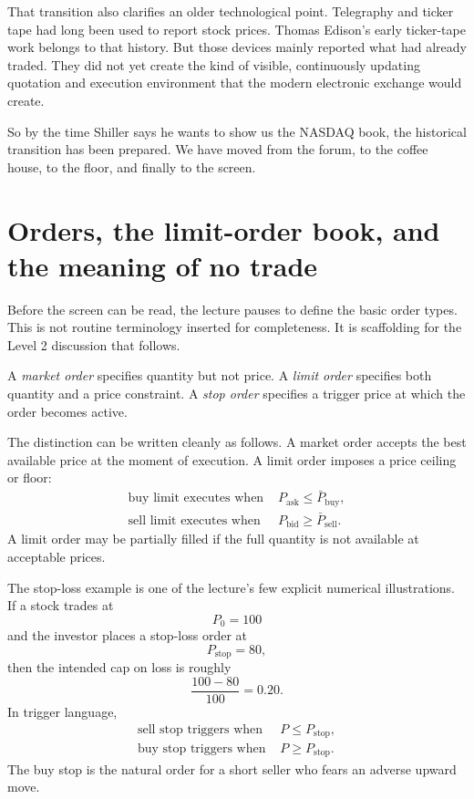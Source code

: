 That transition also clarifies an older technological point. Telegraphy and ticker tape had long been used to report stock prices. Thomas Edison's early ticker-tape work belongs to that history. But those devices mainly reported what had already traded. They did not yet create the kind of visible, continuously updating quotation and execution environment that the modern electronic exchange would create.

So by the time Shiller says he wants to show us the NASDAQ book, the historical transition has been prepared. We have moved from the forum, to the coffee house, to the floor, and finally to the screen.

\section{Orders, the limit-order book, and the meaning of no trade}

Before the screen can be read, the lecture pauses to define the basic order types. This is not routine terminology inserted for completeness. It is scaffolding for the Level 2 discussion that follows.

\begin{definition}
A \emph{market order} specifies quantity but not price. A \emph{limit order} specifies both quantity and a price constraint. A \emph{stop order} specifies a trigger price at which the order becomes active.
\end{definition}

The distinction can be written cleanly as follows. A market order accepts the best available price at the moment of execution. A limit order imposes a price ceiling or floor:
\begin{align}
\text{buy limit executes when } & P_{\text{ask}} \le \bar P_{\text{buy}}, \\
\text{sell limit executes when } & P_{\text{bid}} \ge \bar P_{\text{sell}}.
\end{align}
A limit order may be partially filled if the full quantity is not available at acceptable prices.

The stop-loss example is one of the lecture's few explicit numerical illustrations. If a stock trades at
\begin{equation}
P_0 = 100
\end{equation}
and the investor places a stop-loss order at
\begin{equation}
P_{\text{stop}} = 80,
\end{equation}
then the intended cap on loss is roughly
\begin{equation}
\frac{100-80}{100}=0.20.
\end{equation}
In trigger language,
\begin{align}
\text{sell stop triggers when } & P \le P_{\text{stop}}, \\
\text{buy stop triggers when } & P \ge P_{\text{stop}}.
\end{align}
The buy stop is the natural order for a short seller who fears an adverse upward move.


